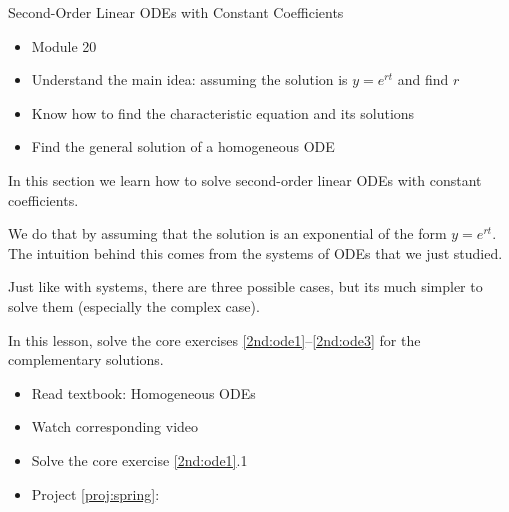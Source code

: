\begin{module}{Second-Order Linear ODEs with Constant Coefficients}
	\label{2nd:solving}

	
	
\end{module}



\begin{lesson}

	\begin{itemize}
		\item Module 20
	\end{itemize}

	\begin{itemize}
		\item Understand the main idea: assuming the solution is $y=e^{rt}$ and find $r$
		\item Know how to find the characteristic equation and its solutions
		\item Find the general solution of a homogeneous ODE
	\end{itemize}
	


In this section we learn how to solve second-order linear ODEs with constant coefficients.

We do that by assuming that the solution is an exponential of the form $y=e^{rt}$. The intuition behind this comes from the systems of ODEs that we just studied.

Just like with systems, there are three possible cases, but its much simpler to solve them (especially the complex case).

In this lesson, solve the core exercises \ref{2nd:ode1}--\ref{2nd:ode3} for the complementary solutions.

\begin{itemize}
	\item Read textbook: Homogeneous ODEs
	\item Watch corresponding video
	\item Solve the core exercise \ref{2nd:ode1}.1
\end{itemize}


\begin{itemize}
	\item Project \ref{proj:spring}: \springtitle
\end{itemize}

\end{lesson}




